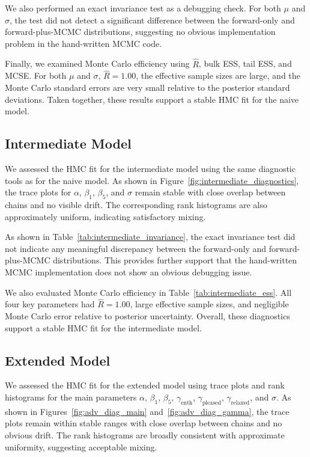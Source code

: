 \documentclass[12pt,letterpaper,fleqn]{article}
\begin{document}
We also performed an exact invariance test as a debugging check. For both $\mu$ and $\sigma$, the test did not detect a significant difference between the forward-only and forward-plus-MCMC distributions, suggesting no obvious implementation problem in the hand-written MCMC code.

Finally, we examined Monte Carlo efficiency using $\hat{R}$, bulk ESS, tail ESS, and MCSE. For both $\mu$ and $\sigma$, $\hat{R}=1.00$, the effective sample sizes are large, and the Monte Carlo standard errors are very small relative to the posterior standard deviations. Taken together, these results support a stable HMC fit for the naive model.

\subsection{Intermediate Model}

We assessed the HMC fit for the intermediate model using the same diagnostic tools as for the naive model. As shown in Figure~\ref{fig:intermediate_diagnostics}, the trace plots for $\alpha$, $\beta_1$, $\beta_5$, and $\sigma$ remain stable with close overlap between chains and no visible drift. The corresponding rank histograms are also approximately uniform, indicating satisfactory mixing.

As shown in Table~\ref{tab:intermediate_invariance}, the exact invariance test did not indicate any meaningful discrepancy between the forward-only and forward-plus-MCMC distributions. This provides further support that the hand-written MCMC implementation does not show an obvious debugging issue.

We also evaluated Monte Carlo efficiency in Table~\ref{tab:intermediate_ess}. All four key parameters had $\hat{R}=1.00$, large effective sample sizes, and negligible Monte Carlo error relative to posterior uncertainty. Overall, these diagnostics support a stable HMC fit for the intermediate model.

\subsection{Extended Model}

We assessed the HMC fit for the extended model using trace plots and rank histograms for the main parameters $\alpha$, $\beta_1$, $\beta_5$, $\gamma_{\text{enth}}$, $\gamma_{\text{pleased}}$, $\gamma_{\text{relaxed}}$, and $\sigma$. As shown in Figures~\ref{fig:adv_diag_main} and~\ref{fig:adv_diag_gamma}, the trace plots remain within stable ranges with close overlap between chains and no obvious drift. The rank histograms are broadly consistent with approximate uniformity, suggesting acceptable mixing.
\end{document}
